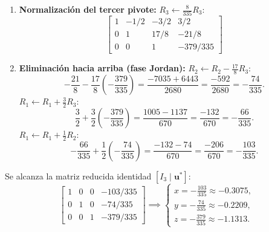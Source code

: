 \documentclass[spanish,letterpaper,oneside]{article}
\begin{document}
\begin{enumerate}
\item \textbf{Normalización del tercer pivote:} $R_3 \leftarrow \frac{8}{335} R_3$:
\begin{equation*}
\left[\begin{array}{rrr|r}
1 & -1/2 & -3/2 & 3/2 \\
0 & 1 & 17/8 & -21/8 \\
0 & 0 & 1 & -379/335
\end{array}\right]
\end{equation*}

\item \textbf{Eliminación hacia arriba (fase Jordan):}
$R_2 \leftarrow R_2 - \frac{17}{8} R_3$:
\begin{equation*}
-\frac{21}{8} - \frac{17}{8}\left(-\frac{379}{335}\right) = \frac{-7035 + 6443}{2680} = \frac{-592}{2680} = -\frac{74}{335}.
\end{equation*}
$R_1 \leftarrow R_1 + \frac{3}{2} R_3$:
\begin{equation*}
\frac{3}{2} + \frac{3}{2}\left(-\frac{379}{335}\right) = \frac{1005 - 1137}{670} = \frac{-132}{670} = -\frac{66}{335}.
\end{equation*}
$R_1 \leftarrow R_1 + \frac{1}{2} R_2$:
\begin{equation*}
-\frac{66}{335} + \frac{1}{2}\left(-\frac{74}{335}\right) = \frac{-132 - 74}{670} = \frac{-206}{670} = -\frac{103}{335}.
\end{equation*}
\end{enumerate}

Se alcanza la matriz reducida identidad $[I_3 \mid \mathbf{u}^*]$:
\begin{equation}
\left[\begin{array}{rrr|r}
1 & 0 & 0 & -103/335 \\
0 & 1 & 0 & -74/335 \\
0 & 0 & 1 & -379/335
\end{array}\right] \implies
\begin{cases}
x = -\frac{103}{335} \approx -0.3075, \\
y = -\frac{74}{335} \approx -0.2209, \\
z = -\frac{379}{335} \approx -1.1313.
\end{cases}
\end{equation}
\end{document}
